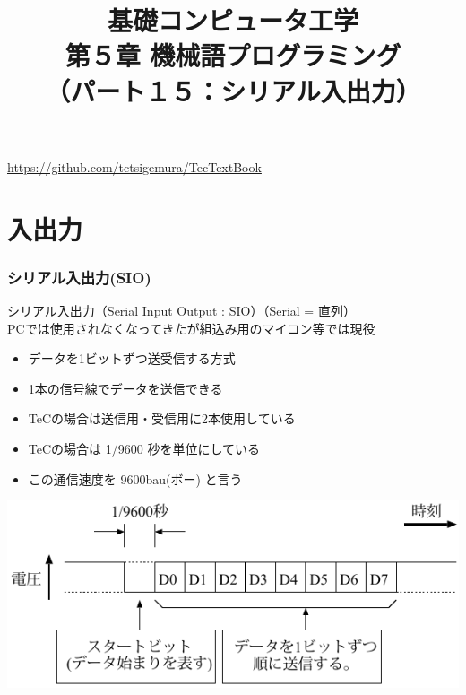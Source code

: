 \documentclass[handout]{beamer}        %
\begin{document}
\title{基礎コンピュータ工学\\第５章 機械語プログラミング\\
       （パート１５：シリアル入出力）}
\date{}

\begin{frame}
  \titlepage
  \centerline{\url{https://github.com/tctsigemura/TecTextBook}}
  \vfill
\end{frame}


\section{入出力}
\begin{frame}
  \frametitle{シリアル入出力(SIO)}
  シリアル入出力（Serial Input Output : SIO）（Serial = 直列） \\
  PCでは使用されなくなってきたが組込み用のマイコン等では現役
  \begin{itemize}
    \item データを1ビットずつ送受信する方式
    \item 1本の信号線でデータを送信できる
    \item TeCの場合は送信用・受信用に2本使用している
    \item TeCの場合は 1/9600 秒を単位にしている
    \item この通信速度を 9600bau(ボー) と言う
  \end{itemize}
  \centerline{\includegraphics[scale=0.8]{../chap5/serial0.pdf}}
\end{frame}
\end{document}
